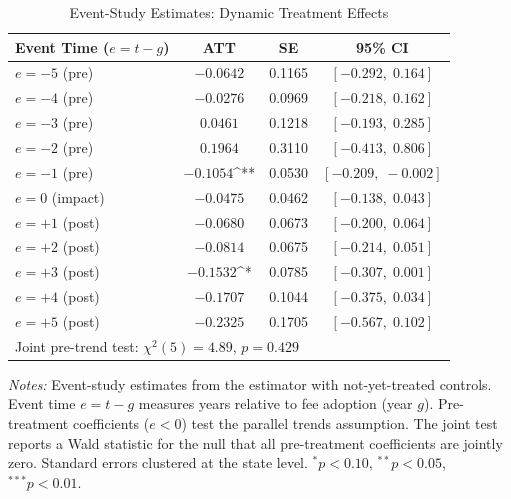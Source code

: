 \begin{table}[t]
\centering
\caption{Event-Study Estimates: Dynamic Treatment Effects}
\label{tab:eventstudy}
\begin{tabular}{lccc}
\toprule
Event Time ($e = t - g$) & ATT & SE & 95\% CI \\
\midrule
$e = -5$ (pre) & $-0.0642$ & 0.1165 & $[-0.292,\;0.164]$ \\
$e = -4$ (pre) & $-0.0276$ & 0.0969 & $[-0.218,\;0.162]$ \\
$e = -3$ (pre) & $0.0461$ & 0.1218 & $[-0.193,\;0.285]$ \\
$e = -2$ (pre) & $0.1964$ & 0.3110 & $[-0.413,\;0.806]$ \\
$e = -1$ (pre) & $-0.1054$^{**} & 0.0530 & $[-0.209,\;-0.002]$ \\
$e = 0$ (impact) & $-0.0475$ & 0.0462 & $[-0.138,\;0.043]$ \\
$e = +1$ (post) & $-0.0680$ & 0.0673 & $[-0.200,\;0.064]$ \\
$e = +2$ (post) & $-0.0814$ & 0.0675 & $[-0.214,\;0.051]$ \\
$e = +3$ (post) & $-0.1532$^{*} & 0.0785 & $[-0.307,\;0.001]$ \\
$e = +4$ (post) & $-0.1707$ & 0.1044 & $[-0.375,\;0.034]$ \\
$e = +5$ (post) & $-0.2325$ & 0.1705 & $[-0.567,\;0.102]$ \\
\midrule
\multicolumn{4}{l}{Joint pre-trend test: $\chi^2(5) = 4.89$, $p = 0.429$} \\
\bottomrule
\end{tabular}
\begin{tablenotes}[flushleft]\small
\item \textit{Notes:} Event-study estimates from the \citet{callaway2021difference} estimator with not-yet-treated controls. Event time $e = t - g$ measures years relative to fee adoption (year $g$). Pre-treatment coefficients ($e < 0$) test the parallel trends assumption. The joint test reports a Wald statistic for the null that all pre-treatment coefficients are jointly zero. Standard errors clustered at the state level. $^{*}p<0.10$, $^{**}p<0.05$, $^{***}p<0.01$.
\end{tablenotes}
\end{table}

